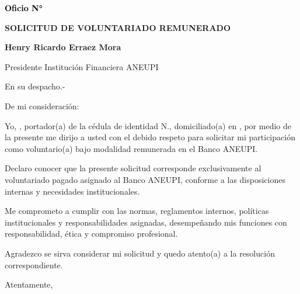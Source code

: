 \documentclass[a4paper,12pt]{article}
\begin{document}
\pagestyle{empty}

\vspace*{-4.5cm}
\noindent
\hfill
{\footnotesize \textcolor{black}{\textbf{Oficio N° }}}

\vspace{2.5cm}
\noindent
\hspace*{\dimexpr\textwidth+1cm\relax}

\begin{center}
    \textbf{\large SOLICITUD DE VOLUNTARIADO REMUNERADO}
\end{center}

\vspace{0.5cm}

\noindent \textbf{Henry Ricardo Erraez Mora} 

\noindent Presidente Institución Financiera ANEUPI 

\noindent En su despacho.-

\vspace{1cm}

\noindent De mi consideración:

\noindent Yo, \textbf{\underline{\hspace{6cm}}}, portador(a) de la cédula de identidad N.\textbf{\underline{\hspace{4cm}}}, domiciliado(a) en \textbf{\underline{\hspace{8cm}}}, por medio de la presente me dirijo a usted con el debido respeto para solicitar mi participación como voluntario(a) bajo modalidad remunerada en el Banco ANEUPI.

\vspace{0.5cm}

\noindent Declaro conocer que la presente solicitud corresponde exclusivamente al voluntariado pagado asignado al Banco ANEUPI, conforme a las disposiciones internas y necesidades institucionales.

\vspace{0.5cm}

\noindent Me comprometo a cumplir con las normas, reglamentos internos, políticas institucionales y responsabilidades asignadas, desempeñando mis funciones con responsabilidad, ética y compromiso profesional.

\vspace{0.5cm}

\noindent Agradezco se sirva considerar mi solicitud y quedo atento(a) a la resolución correspondiente.


\noindent Atentamente,

\vspace{2.5cm}


\noindent{}  

\noindent{}      

\noindent{}  

\noindent{} 
\end{document}
